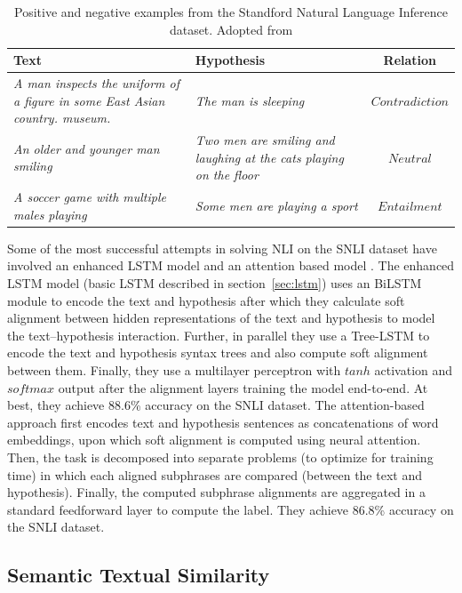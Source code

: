 \begin{table}
	\centering
	\begin{tabular}{p{8cm} | p{5cm} | c}
		Text & Hypothesis & Relation \\
		\toprule
		\textit{
		A man inspects the uniform of a figure in some East Asian country.
		museum.} & 
		\textit{The man is sleeping}
		& $\mathit{Contradiction}$ \\
		\textit{An older and younger man smiling} & 
		\textit{Two men are smiling and laughing at the cats playing on the floor}
		& $\mathit{Neutral}$ \\
		\textit{A soccer game with multiple males playing} &
		\textit{Some men are playing a sport} & $\mathit{Entailment}$ \\
		\bottomrule
	\end{tabular}
	\caption{Positive and negative examples from the Standford Natural Language Inference dataset. 
	Adopted from \citep{bowman2015large}}
	\label{tab:snli_examples}
\end{table}

Some of the most successful attempts in solving NLI on the SNLI dataset have involved
an enhanced LSTM model \citep{chen2016enhanced} and 
an attention based model \citep{parikh2016decomposable}. 
The enhanced LSTM model (basic LSTM described in section~\ref{sec:lstm}) 
uses an BiLSTM module to encode the text and hypothesis after which they calculate 
soft alignment between hidden representations of the text and hypothesis to model the
text--hypothesis interaction. Further, in parallel they use a Tree-LSTM to encode 
the text and hypothesis syntax trees and also compute soft alignment between them. 
Finally, they use a multilayer perceptron with $\mathit{tanh}$ activation and 
$\mathit{softmax}$ output after the alignment layers training the model end-to-end. 
At best, they achieve 88.6\% accuracy on the SNLI dataset. 
The attention-based approach \citep{parikh2016decomposable} first encodes 
text and hypothesis sentences as concatenations of word embeddings, upon which
soft alignment is computed using
neural attention. Then, the task is decomposed into separate problems (to optimize 
for training time) in which each aligned subphrases are compared (between the text and 
hypothesis). Finally, the computed subphrase alignments are aggregated in 
a standard feedforward layer to compute the label. They achieve 
86.8\% accuracy on the SNLI dataset. 

\subsection{Semantic Textual Similarity}
\label{sec:sts}

